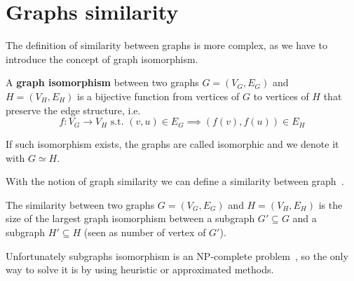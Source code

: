\section{Graphs similarity}

The definition of similarity between graphs is more complex, as we have to introduce the concept of graph isomorphism.

\begin{definizione}
	A \textbf{graph isomorphism} between two graphs $G=(V_{G}, E_{G})$ and $H=(V_{H}, E_{H})$ is a bijective function from vertices of $G$ to vertices of $H$ that preserve the edge structure, i.e.  
	\begin{equation}
	f : V_{G} \rightarrow V_{H} \text{ s.t. } (v, u) \in E_{G} \implies (f(v), f(u)) \in E_{H}
	\end{equation}
\end{definizione}

If such isomorphism exists, the graphs are called isomorphic and we denote it with $G \simeq H$.\medskip

With the notion of graph similarity we can define a similarity between graph~\cite{Bunke:1998:GDM:289720.289729}.\medskip

\begin{definizione}
	The similarity between two graphs $G=(V_{G}, E_{G})$ and $H=(V_{H}, E_{H})$ is the size of the largest graph isomorphism between a subgraph $G' \subseteq G$ and a subgraph $H' \subseteq H$ (seen as number of vertex of $G'$).
\end{definizione}

Unfortunately subgraphs isomorphism is an NP-complete problem~\cite{GareyJohnson:1979}, so the only way to solve it is by using heuristic or approximated methods.

